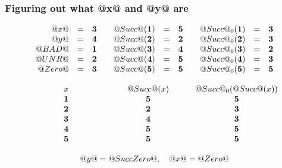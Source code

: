 \documentclass[serif,professionalfont]{beamer}
\begin{document}
\begin{frame}[fragile]
  \frametitle{Figuring out what @x@ and @y@ are}

  \[\begin{array}{ccc}

    \begin{array}{rcl}
    @x@ & = & \mathbf{3} \\
    @y@ & = & \mathbf{4} \\
    @BAD@ & = & \mathbf{1} \\
    @UNR@ & = & \mathbf{2} \\
    @Zero@ & = & \mathbf{3} \\
    \end{array}

  &

    \begin{array}{lcl}
    @Succ@(\mathbf{1}) & = & \mathbf{5} \\
    @Succ@(\mathbf{2}) & = & \mathbf{2} \\
    @Succ@(\mathbf{3}) & = & \mathbf{4} \\
    @Succ@(\mathbf{4}) & = & \mathbf{5} \\
    @Succ@(\mathbf{5}) & = & \mathbf{5} \\
    \end{array}

  &

    \begin{array}{lcl}
    @Succ@_0(\mathbf{1}) & = & \mathbf{3} \\
    @Succ@_0(\mathbf{2}) & = & \mathbf{3} \\
    @Succ@_0(\mathbf{3}) & = & \mathbf{2} \\
    @Succ@_0(\mathbf{4}) & = & \mathbf{3} \\
    @Succ@_0(\mathbf{5}) & = & \mathbf{5} \\
    \end{array}

  \\
  \\

    x          & @Succ@(x)  & @Succ@_0(@Succ@(x)) \\
    \mathbf{1} & \mathbf{5} & \mathbf{5} \\
    \mathbf{2} & \mathbf{2} & \mathbf{3} \\
    \mathbf{3} & \mathbf{4} & \mathbf{3} \\
    \mathbf{4} & \mathbf{5} & \mathbf{5} \\
    \mathbf{5} & \mathbf{5} & \mathbf{5} \\

  \\

    \multicolumn{3}{c}{@y@ = @Succ Zero@, \quad  @x@ = @Zero@}

  \end{array}\]

\end{frame}
\end{document}
